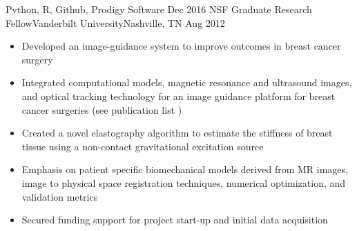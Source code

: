 \begin{experiences}
{\begin{itemize}
                      \end{itemize}
                    }
                    {Python, R, Github, Prodigy Software}
  \emptySeparator
  \experience
    {Dec 2016} {NSF Graduate Research Fellow}{Vanderbilt University}{Nashville, TN}
    {Aug 2012}    {
                      \begin{itemize}
                        \item Developed an image-guidance system to improve outcomes in breast cancer surgery            
                        \item Integrated computational models, magnetic resonance and ultrasound images, and optical tracking technology for an image guidance platform for breast cancer surgeries (see publication list \href{https://orcid.org/0000-0002-9352-9813}{\aiOrcid})         
                        \item Created a novel elastography algorithm to estimate the stiffness of breast tissue using a non-contact gravitational excitation source
                        \item Emphasis on patient specific biomechanical models derived from MR images, image to physical space registration techniques, numerical optimization, and validation metrics 
                        \item Secured funding support for project start-up and initial data acquisition               
                                                                      

\end{itemize}}
\end{experiences}
